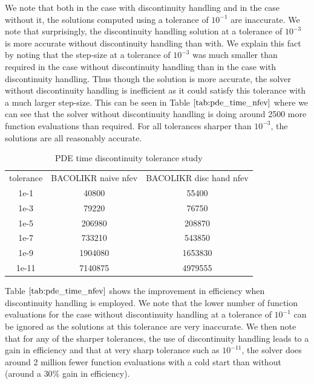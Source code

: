 \documentclass{article}
\begin{document}
We note that both in the case with discontinuity handling and in the case without it, the solutions computed using a tolerance of $10^{-1}$ are inaccurate. We note that surprisingly, the discontinuity handling solution at a tolerance of $10^{-3}$ is more accurate without discontinuity handling than with. We explain this fact by noting that the step-size at a tolerance of $10^{-3}$ was much smaller than required in the case without discontinuity handling than in the case with discontinuity handling. Thus though the solution is more accurate, the solver without discontinuity handling is inefficient as it could satisfy this tolerance with a much larger step-size. This can be seen in Table $\ref{tab:pde_time_nfev}$ where we can see that the solver without discontinuity handling is doing around 2500 more function evaluations than required. For all tolerances sharper than $10^{-3}$, the solutions are all reasonably accurate.

\begin{table}[h]
\caption {PDE time discontinuity tolerance study} 
\label{tab:pde_time_nfev}
\begin{center}
\begin{tabular}{ c c c } 
tolerance & BACOLIKR naive nfev & BACOLIKR disc hand nfev \\ 
1e-1      &   40800         &   55400 \\
1e-3      &   79220         &   76750 \\
1e-5      &  206980         &  208870 \\
1e-7      &  733210         &  543850 \\
1e-9      & 1904080         & 1653830 \\
1e-11     & 7140875         & 4979555 \\
\end{tabular}
\end{center}
\end{table}

Table $\ref{tab:pde_time_nfev}$ shows the improvement in efficiency when discontinuity handling is employed. We note that the lower number of function evaluations for the case without discontinuity handling at a tolerance of $10^{-1}$ can be ignored as the solutions at this tolerance are very inaccurate. We then note that for any of the sharper tolerances, the use of discontinuity handling leads to a gain in efficiency and that at very sharp tolerance such as $10^{-11}$, the solver does around 2 million fewer function evaluations with a cold start than without (around a $30\%$ gain in efficiency). 
\end{document}
